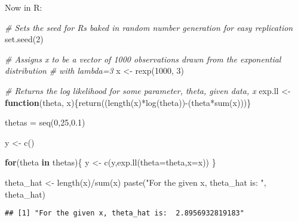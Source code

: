 \documentclass[
]{article}
\newenvironment{Shaded}{\begin{snugshade}}{\end{snugshade}}
\newcommand{\AttributeTok}[1]{\textcolor[rgb]{0.77,0.63,0.00}{#1}}
\newcommand{\CommentTok}[1]{\textcolor[rgb]{0.56,0.35,0.01}{\textit{#1}}}
\newcommand{\ControlFlowTok}[1]{\textcolor[rgb]{0.13,0.29,0.53}{\textbf{#1}}}
\newcommand{\DecValTok}[1]{\textcolor[rgb]{0.00,0.00,0.81}{#1}}
\newcommand{\FloatTok}[1]{\textcolor[rgb]{0.00,0.00,0.81}{#1}}
\newcommand{\FunctionTok}[1]{\textcolor[rgb]{0.00,0.00,0.00}{#1}}
\newcommand{\NormalTok}[1]{#1}
\newcommand{\OtherTok}[1]{\textcolor[rgb]{0.56,0.35,0.01}{#1}}
\newcommand{\SpecialCharTok}[1]{\textcolor[rgb]{0.00,0.00,0.00}{#1}}
\newcommand{\StringTok}[1]{\textcolor[rgb]{0.31,0.60,0.02}{#1}}
\begin{document}
Now in R:

\begin{Shaded}
\begin{Highlighting}[]
\CommentTok{\# Sets the seed for R\textquotesingle{}s baked in random number generation for easy replication}
\FunctionTok{set.seed}\NormalTok{(}\DecValTok{2}\NormalTok{)}

\CommentTok{\# Assigns x to be a vector of 1000 observations drawn from the exponential distribution}
\CommentTok{\# with lambda=3}
\NormalTok{x }\OtherTok{\textless{}{-}} \FunctionTok{rexp}\NormalTok{(}\DecValTok{1000}\NormalTok{, }\DecValTok{3}\NormalTok{)}

\CommentTok{\# Returns the log likelihood for some parameter, theta, given data, x}
\NormalTok{exp.ll }\OtherTok{\textless{}{-}} \ControlFlowTok{function}\NormalTok{(theta, x)\{}\FunctionTok{return}\NormalTok{((}\FunctionTok{length}\NormalTok{(x)}\SpecialCharTok{*}\FunctionTok{log}\NormalTok{(theta))}\SpecialCharTok{{-}}\NormalTok{(theta}\SpecialCharTok{*}\FunctionTok{sum}\NormalTok{(x)))\}}

\NormalTok{thetas }\OtherTok{=} \FunctionTok{seq}\NormalTok{(}\DecValTok{0}\NormalTok{,}\DecValTok{25}\NormalTok{,}\FloatTok{0.1}\NormalTok{)}

\NormalTok{y }\OtherTok{\textless{}{-}} \FunctionTok{c}\NormalTok{()}

\ControlFlowTok{for}\NormalTok{(theta }\ControlFlowTok{in}\NormalTok{ thetas)\{}
\NormalTok{  y }\OtherTok{\textless{}{-}} \FunctionTok{c}\NormalTok{(y,}\FunctionTok{exp.ll}\NormalTok{(}\AttributeTok{theta=}\NormalTok{theta,}\AttributeTok{x=}\NormalTok{x))}
\NormalTok{\}}

\NormalTok{theta\_hat }\OtherTok{\textless{}{-}} \FunctionTok{length}\NormalTok{(x)}\SpecialCharTok{/}\FunctionTok{sum}\NormalTok{(x)}
\FunctionTok{paste}\NormalTok{(}\StringTok{"For the given x, theta\_hat is: "}\NormalTok{, theta\_hat)}
\end{Highlighting}
\end{Shaded}

\begin{verbatim}
## [1] "For the given x, theta_hat is:  2.8956932819183"
\end{verbatim}
\end{document}
